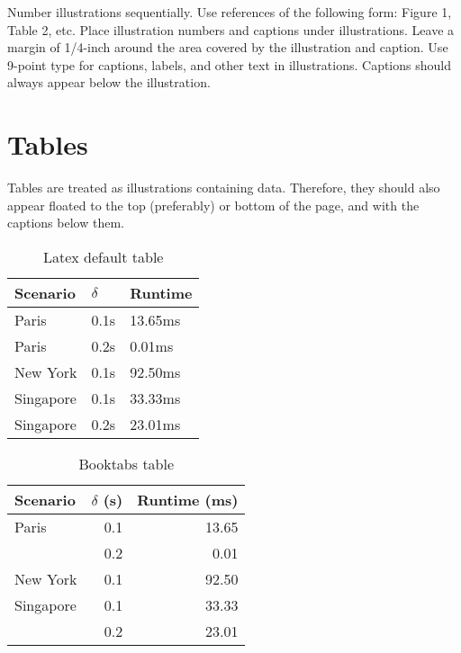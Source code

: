 \documentclass{article}
\begin{document}
Number illustrations sequentially. Use references of the following
form: Figure 1, Table 2, etc. Place illustration numbers and captions
under illustrations. Leave a margin of 1/4-inch around the area
covered by the illustration and caption.  Use 9-point type for
captions, labels, and other text in illustrations. Captions should always appear below the illustration.

\section{Tables}

Tables are treated as illustrations containing data. Therefore, they should also appear floated to the top (preferably) or bottom of the page, and with the captions below them.

\begin{table}
    \centering
    \begin{tabular}{lll}
        \hline
        Scenario  & $\delta$ & Runtime \\
        \hline
        Paris     & 0.1s     & 13.65ms \\
        Paris     & 0.2s     & 0.01ms  \\
        New York  & 0.1s     & 92.50ms \\
        Singapore & 0.1s     & 33.33ms \\
        Singapore & 0.2s     & 23.01ms \\
        \hline
    \end{tabular}
    \caption{Latex default table}
    \label{tab:plain}
\end{table}

\begin{table}
    \centering
    \begin{tabular}{lrr}
        \toprule
        Scenario  & $\delta$ (s) & Runtime (ms) \\
        \midrule
        Paris     & 0.1          & 13.65        \\
                  & 0.2          & 0.01         \\
        New York  & 0.1          & 92.50        \\
        Singapore & 0.1          & 33.33        \\
                  & 0.2          & 23.01        \\
        \bottomrule
    \end{tabular}
    \caption{Booktabs table}
    \label{tab:booktabs}
\end{table}
\end{document}
